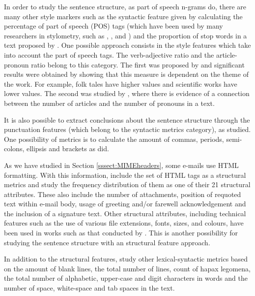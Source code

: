 In order to study the sentence structure, as part of speech n-grams do, there are many other style markers such as the syntactic feature given by calculating the percentage of part of speech (POS) tags (which have been used by many researchers in stylometry, such as \cite{argamon1998style}, \cite{zhao2007searching}, \cite{ott2011finding} and \cite{cfgstylo}) and the proportion of stop words in a text proposed by \cite{ril2014determination}. One possible approach consists in the style features which take into account the part of speech tags. The verb-adjective ratio and the article-pronoun ratio belong to this category. The first was proposed by \cite{antosch1969diagnosis} and significant results were obtained by showing that this measure is dependent on the theme of the work. For example, folk tales have higher values and scientific works have lower values. The second was studied by \cite{brainerd1974weighting}, where there is evidence of a connection between the number of articles and the number of pronouns in a text.

It is also possible to extract conclusions about the sentence structure through the punctuation features (which belong to the syntactic metrics category), as \cite{baayen2002experiment} studied. One possibility of metrics is to calculate the amount of commas, periods, semi-colons, ellipsis and brackets as \cite{calix2008stylometry} did.

As we have studied in Section \ref{sssect:MIMEheaders}, some e-mails use HTML formatting. With this information, \cite{de2001mining} include the set of HTML tags as a structural metrics and study the frequency distribution of them as one of their 21 structural attributes. These also include the number of attachments, position of requoted text within e-mail body, usage of greeting and/or farewell acknowledgement and the inclusion of a signature text. Other structural attributes, including technical features such as the use of various file extensions, fonts, sizes, and colours, have been used in works such as that conducted by \cite{abbasi2005applying}. This is another possibility for studying the sentence structure with an structural feature approach. 

In addition to the structural features, \cite{de2001mining} study other lexical-syntactic metrics based on the amount of blank lines, the total number of lines, count of hapax legomena, the total number of alphabetic, upper-case and digit characters in words and the number of space, white-space and tab spaces in the text.

